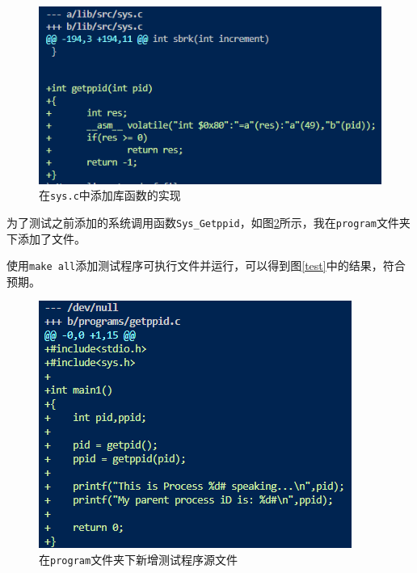 \begin{figure}[!htbp]
    \centering
    \includegraphics[scale=1]{images/lib_implement.png}
    \caption{在\texttt{sys.c}中添加库函数的实现}\label{lib_implement}
\end{figure}

为了测试之前添加的系统调用函数\texttt{Sys\_Getppid}，如图\ref{test_program}所示，我在\texttt{program}文件夹下添加了文件。

使用\texttt{make all}添加测试程序可执行文件并运行，可以得到图\ref{test}中的结果，符合预期。

\begin{figure}[!htbp]
    \centering
    \includegraphics[scale=1]{images/test_program.png}
    \caption{在\texttt{program}文件夹下新增测试程序源文件}\label{test_program}
\end{figure}


